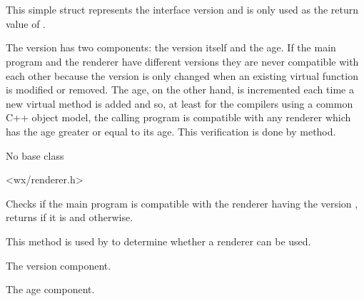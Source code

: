 
\section{}\label{wxrendererversion}

This simple struct represents the  
interface version and is only used as the return value of 
.

The version has two components: the version itself and the age. If the main
program and the renderer have different versions they are never compatible with
each other because the version is only changed when an existing virtual
function is modified or removed. The age, on the other hand, is incremented
each time a new virtual method is added and so, at least for the compilers
using a common C++ object model, the calling program is compatible with any
renderer which has the age greater or equal to its age. This verification is
done by  method.



No base class


<wx/renderer.h>



\label{wxrenderernativeiscompatible}


Checks if the main program is compatible with the renderer having the version 
, returns \true if it is and \false otherwise.

This method is used by 
 to determine whether a
renderer can be used.


\label{wxrendererversionversion}


The version component.


\label{wxrendererversionage}


The age component.

